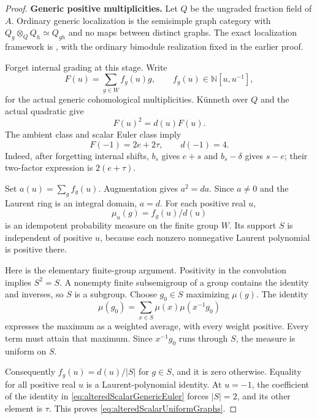 \begin{proof}
\par\smallskip\noindent\textbf{Generic positive multiplicities.}\quad
Let \(Q\) be the ungraded fraction field of \(A\).
Ordinary generic localization is the semisimple graph
category with \(Q_g\otimes_Q Q_h\simeq Q_{gh}\) and
no maps between distinct graphs. The exact localization
framework is \cite[\S1.1, equations (1.1)--(1.2);
\S1.2, Theorem~1.6 and Remark~1.7]{EWLocalized}, with
the ordinary bimodule realization fixed in the earlier
 proof.

Forget internal grading at this stage. Write
\[
 F(u)=\sum_{g\in W}f_g(u)g,
 \qquad f_g(u)\in\mathbb N[u,u^{-1}],
\]
for the actual generic cohomological multiplicities.
K\"unneth over \(Q\) and the actual quadratic give
\begin{equation}\label{eq:alteredScalarGroupQuadratic}
                         F(u)^2=d(u)F(u).
\end{equation}
The ambient class and scalar Euler class imply
\begin{equation}\label{eq:alteredScalarGenericEuler}
                    F(-1)=2e+2\tau,\qquad d(-1)=4.
\end{equation}
Indeed, after forgetting internal shifts, \(b_s\) gives
\(e+s\) and \(b_s-\delta\) gives \(s-e\); their
two-factor expression is \(2(e+\tau)\).

Set \(a(u)=\sum_g f_g(u)\). Augmentation gives
\(a^2=da\). Since \(a\ne0\) and the Laurent ring is
an integral domain, \(a=d\). For each positive real
\(u\),
\[
                       \mu_u(g)=f_g(u)/d(u)
\]
is an idempotent probability measure on the finite group
\(W\). Its support \(S\) is independent of positive
\(u\), because each nonzero nonnegative Laurent polynomial
is positive there.

Here is the elementary finite-group argument. Positivity
in the convolution implies \(S^2=S\). A nonempty finite
subsemigroup of a group contains the identity and inverses,
so \(S\) is a subgroup. Choose \(g_0\in S\) maximizing
\(\mu(g)\). The identity
\[
 \mu(g_0)=\sum_{x\in S}\mu(x)\mu(x^{-1}g_0)
\]
expresses the maximum as a weighted average, with every
weight positive. Every term must attain that maximum.
Since \(x^{-1}g_0\) runs through \(S\), the measure is
uniform on \(S\).

Consequently \(f_g(u)=d(u)/|S|\) for \(g\in S\),
and it is zero otherwise. Equality for all positive real
\(u\) is a Laurent-polynomial identity. At \(u=-1\),
the coefficient of the identity in
\eqref{eq:alteredScalarGenericEuler} forces \(|S|=2\),
and its other element is \(\tau\). This proves
\eqref{eq:alteredScalarUniformGraphs}.


\end{proof}
